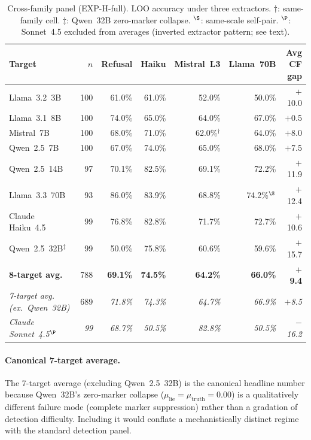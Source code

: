 \begin{table}[h]
\centering
\caption{Cross-family panel (EXP-H-full). LOO accuracy under three extractors. $\dagger$: same-family cell. $\ddagger$: Qwen~32B zero-marker collapse. $^\S$: same-scale self-pair. $^\P$: Sonnet~4.5 excluded from averages (inverted extractor pattern; see text).}
\label{tab:cross_family_panel}
\begin{small}
\begin{tabular}{lrrrrrr}
\toprule
\textbf{Target} & \textbf{$n$} & \textbf{Refusal} & \textbf{Haiku} & \textbf{Mistral~L3} & \textbf{Llama~70B} & \textbf{Avg CF gap} \\
\midrule
Llama~3.2~3B     & 100 & 61.0\% & 61.0\% & 52.0\% & 50.0\% & $+$10.0 \\
Llama~3.1~8B     & 100 & 74.0\% & 65.0\% & 64.0\% & 67.0\% & $+$0.5 \\
Mistral~7B       & 100 & 68.0\% & 71.0\% & 62.0\%$^\dagger$ & 64.0\% & $+$8.0 \\
Qwen~2.5~7B      & 100 & 67.0\% & 74.0\% & 65.0\% & 68.0\% & $+$7.5 \\
Qwen~2.5~14B     &  97 & 70.1\% & 82.5\% & 69.1\% & 72.2\% & $+$11.9 \\
Llama~3.3~70B    &  93 & 86.0\% & 83.9\% & 68.8\% & 74.2\%$^\S$ & $+$12.4 \\
Claude Haiku~4.5 &  99 & 76.8\% & 82.8\% & 71.7\% & 72.7\% & $+$10.6 \\
Qwen~2.5~32B$^\ddagger$ &  99 & 50.0\% & 75.8\% & 60.6\% & 59.6\% & $+$15.7 \\
\midrule
\textbf{8-target avg.} & 788 & \textbf{69.1\%} & \textbf{74.5\%} & \textbf{64.2\%} & \textbf{66.0\%} & \textbf{$+$9.4} \\
\textit{7-target avg. (ex.\ Qwen~32B)} & 689 & \textit{71.8\%} & \textit{74.3\%} & \textit{64.7\%} & \textit{66.9\%} & \textit{$+$8.5} \\
\midrule
\textit{Claude Sonnet~4.5$^\P$} & \textit{99} & \textit{68.7\%} & \textit{50.5\%} & \textit{82.8\%} & \textit{50.5\%} & \textit{$-$16.2} \\
\bottomrule
\end{tabular}
\end{small}
\end{table}

\paragraph{Canonical 7-target average.} The 7-target average (excluding Qwen~2.5~32B) is the canonical headline number because Qwen~32B's zero-marker collapse ($\mu_\mathrm{lie}\!=\!\mu_\mathrm{truth}\!=\!0.00$) is a qualitatively different failure mode (complete marker suppression) rather than a gradation of detection difficulty. Including it would conflate a mechanistically distinct regime with the standard detection panel.

